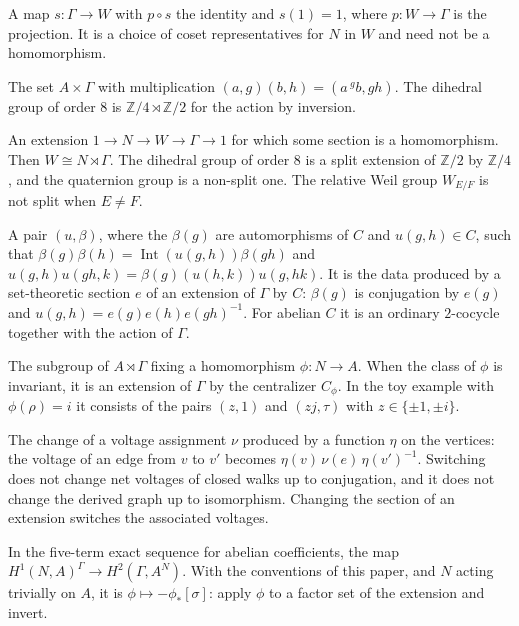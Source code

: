 \documentclass[12pt,letterpaper]{article}
\numberwithin{equation}{section}
\theoremstyle{plain}
\theoremstyle{definition}
\newcommand{\Z}{\mathbb{Z}}
\newcommand{\act}[2]{{}^{#1}\!#2}          %
\DeclareMathOperator{\Int}{Int}
\begin{document}
\begin{description}[itemsep=3pt,leftmargin=1.5em,style=unboxed]
\item[Section.] A map $s:\Gamma\to W$ with $p\circ s$ the identity and
$s(1)=1$, where $p:W\to\Gamma$ is the projection. It is a choice of coset
representatives for $N$ in $W$ and need not be a homomorphism.

\item[Semidirect product $A\rtimes\Gamma$.] The set $A\times\Gamma$ with
multiplication $(a,g)(b,h)=(a\,\act{g}{b},gh)$. The dihedral group of
order $8$ is $\Z/4\rtimes\Z/2$ for the action by inversion.

\item[Split extension.] An extension $1\to N\to W\to\Gamma\to1$ for which
some section is a homomorphism. Then $W\cong N\rtimes\Gamma$. The dihedral
group of order $8$ is a split extension of $\Z/2$ by $\Z/4$, and the
quaternion group is a non-split one. The relative Weil group $W_{E/F}$ is
not split when $E\neq F$.

\item[Springer $2$-cocycle.] A pair $(u,\beta)$, where the $\beta(g)$ are
automorphisms of $C$ and $u(g,h)\in C$, such that
$\beta(g)\beta(h)=\Int(u(g,h))\beta(gh)$ and
$u(g,h)u(gh,k)=\beta(g)(u(h,k))u(g,hk)$. It is the data produced by a
set-theoretic section $e$ of an extension of $\Gamma$ by $C$: $\beta(g)$
is conjugation by $e(g)$ and $u(g,h)=e(g)e(h)e(gh)^{-1}$. For abelian $C$
it is an ordinary $2$-cocycle together with the action of $\Gamma$.

\item[Stabilizer extension $E_\phi$.] The subgroup of $A\rtimes\Gamma$
fixing a homomorphism $\phi:N\to A$. When the class of $\phi$ is
invariant, it is an extension of $\Gamma$ by the centralizer $C_\phi$. In
the toy example with $\phi(\rho)=i$ it consists of the pairs $(z,1)$ and
$(zj,\tau)$ with $z\in\{\pm1,\pm i\}$.

\item[Switching.] The change of a voltage assignment $\nu$ produced by a
function $\eta$ on the vertices: the voltage of an edge from $v$ to $v'$
becomes $\eta(v)\,\nu(e)\,\eta(v')^{-1}$. Switching does not change net
voltages of closed walks up to conjugation, and it does not change the
derived graph up to isomorphism. Changing the section of an extension
switches the associated voltages.

\item[Transgression.] In the five-term exact sequence for abelian
coefficients, the map $H^1(N,A)^\Gamma\to H^2(\Gamma,A^N)$. With the
conventions of this paper, and $N$ acting trivially on $A$, it is
$\phi\mapsto-\phi_*[\sigma]$: apply $\phi$ to a factor set of the
extension and invert.


\end{description}
\end{document}
